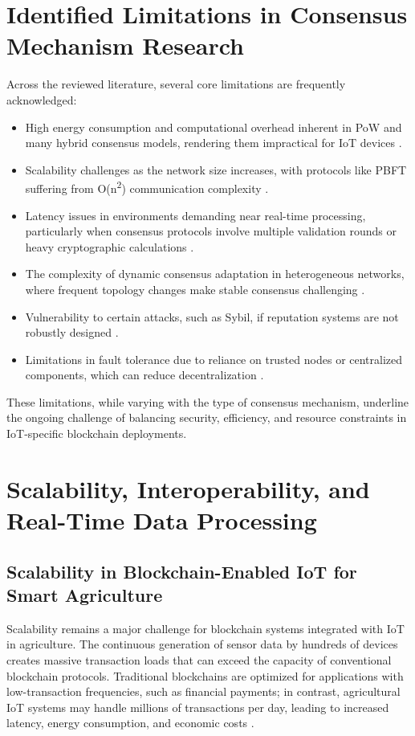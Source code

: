 \documentclass[12pt,onecolumn]{IEEEtran} %
\begin{document}
\section{Identified Limitations in Consensus Mechanism Research}\label{sec:limits}
Across the reviewed literature, several core limitations are frequently acknowledged:
\begin{itemize}
    \item High energy consumption and computational overhead inherent in PoW and many hybrid consensus models, rendering them impractical for IoT devices \cite{ali2022blockchainenabledarchitecture, khan2022asurveyand}.
    \item Scalability challenges as the network size increases, with protocols like PBFT suffering from O(n\textsuperscript{2}) communication complexity \cite{khan2022asurveyand, ali2022blockchainenabledarchitecture}.
    \item Latency issues in environments demanding near real-time processing, particularly when consensus protocols involve multiple validation rounds or heavy cryptographic calculations \cite{guo2022ahierarchicaland, morais2023surveyonintegration}.
    \item The complexity of dynamic consensus adaptation in heterogeneous networks, where frequent topology changes make stable consensus challenging \cite{alam2023anoverviewof, guru2023asurveyon}.
    \item Vulnerability to certain attacks, such as Sybil, if reputation systems are not robustly designed \cite{guru2023asurveyon, platt2023sybilinthe}.
    \item Limitations in fault tolerance due to reliance on trusted nodes or centralized components, which can reduce decentralization \cite{haque2024ascalableblockchain, morais2023surveyonintegration}.
\end{itemize}

These limitations, while varying with the type of consensus mechanism, underline the ongoing challenge of balancing security, efficiency, and resource constraints in IoT-specific blockchain deployments.

\section{Scalability, Interoperability, and Real-Time Data Processing}\label{sec:sir}
  \subsection{Scalability in Blockchain-Enabled IoT for Smart Agriculture}\label{subsec:scalability}
Scalability remains a major challenge for blockchain systems integrated with IoT in agriculture. The continuous generation of sensor data by hundreds of devices creates massive transaction loads that can exceed the capacity of conventional blockchain protocols. Traditional blockchains are optimized for applications with low-transaction frequencies, such as financial payments; in contrast, agricultural IoT systems may handle millions of transactions per day, leading to increased latency, energy consumption, and economic costs \cite{huang2025digitaltraceabilityin, irfan2025aniotdrivensmart}.
\end{document}

